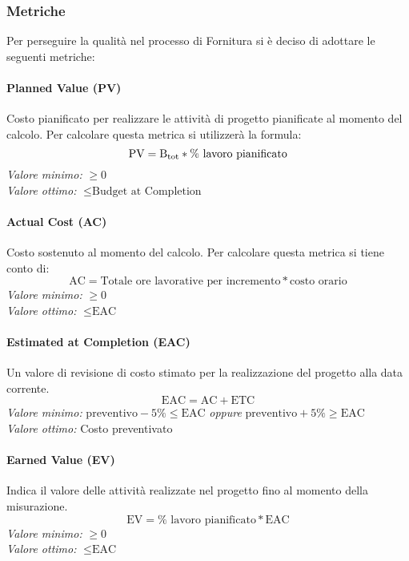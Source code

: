 \subsubsection{Metriche}
Per perseguire la qualità nel processo di Fornitura si è deciso di adottare le seguenti metriche:
\paragraph{Planned Value (PV)}
Costo pianificato per realizzare le attività di progetto pianificate al momento del calcolo.
Per calcolare questa metrica si utilizzerà la formula:
\begin{equation*}
\text{PV}=\text{B}\textsubscript{tot}*\%\text{ lavoro pianificato}
\end{equation*}
\textit{Valore minimo:} $\ge 0$\\
\textit{Valore ottimo:}	$\le \text{Budget at Completion}$
\paragraph{Actual Cost (AC)}
Costo sostenuto al momento del calcolo.
Per calcolare questa metrica si tiene conto di:
\begin{equation*}
\text{AC}=\text{Totale ore lavorative per incremento}*\text{costo orario}
\end{equation*}
\textit{Valore minimo:} $\ge 0$\\
\textit{Valore ottimo:} $\le \text{EAC}$
\paragraph{Estimated at Completion (EAC)}
Un valore di revisione di costo stimato per la realizzazione del progetto alla data corrente.
\begin{equation*}
\text{EAC}=\text{AC}+\text{ETC}
\end{equation*}
\textit{Valore minimo:} 
$\text{preventivo} -5\% \le \text{EAC}$ \textit{oppure} $\text{preventivo} +5\% \ge \text{EAC}$\\
\textit{Valore ottimo:} Costo preventivato
\paragraph{Earned Value (EV)}
Indica il valore delle attività realizzate nel progetto fino al momento della misurazione.
\begin{equation*}
\text{EV}=\%\text{ lavoro pianificato}*\text{EAC}
\end{equation*}
\textit{Valore minimo:} $\ge 0$\\
\textit{Valore ottimo:} $\le \text{EAC}$
